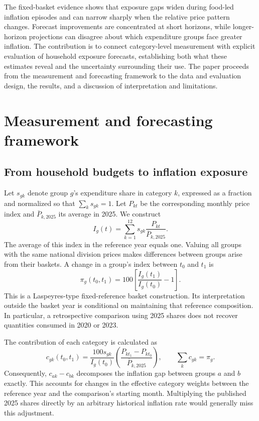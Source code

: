 \documentclass[11pt,a4paper]{article}
\begin{document}
The fixed-basket evidence shows that exposure gaps widen during food-led inflation episodes and can narrow sharply when the relative price pattern changes. Forecast improvements are concentrated at short horizons, while longer-horizon projections can disagree about which expenditure groups face greater inflation. The contribution is to connect category-level measurement with explicit evaluation of household exposure forecasts, establishing both what these estimates reveal and the uncertainty surrounding their use. The paper proceeds from the measurement and forecasting framework to the data and evaluation design, the results, and a discussion of interpretation and limitations.

\section{Measurement and forecasting framework}

\subsection{From household budgets to inflation exposure}

Let $s_{gk}$ denote group $g$'s expenditure share in category $k$, expressed as a fraction and normalized so that $\sum_k s_{gk}=1$. Let $P_{kt}$ be the corresponding monthly price index and $\bar P_{k,2025}$ its average in 2025. We construct
\begin{equation}
 I_g(t)=\sum_{k=1}^{12}s_{gk}\frac{P_{kt}}{\bar P_{k,2025}}.
 \label{eq:index}
\end{equation}
The average of this index in the reference year equals one. Valuing all groups with the same national division prices makes differences between groups arise from their baskets. A change in a group's index between $t_0$ and $t_1$ is
\begin{equation}
 \pi_g(t_0,t_1)=100\left[\frac{I_g(t_1)}{I_g(t_0)}-1\right].
 \label{eq:inflation}
\end{equation}
This is a Laspeyres-type fixed-reference basket construction. Its interpretation outside the basket year is conditional on maintaining that reference composition. In particular, a retrospective comparison using 2025 shares does not recover quantities consumed in 2020 or 2023.

The contribution of each category is calculated as
\begin{equation}
 c_{gk}(t_0,t_1)=
 \frac{100s_{gk}}{I_g(t_0)}
 \left(\frac{P_{kt_1}-P_{kt_0}}{\bar P_{k,2025}}\right),
 \qquad \sum_k c_{gk}=\pi_g.
 \label{eq:contribution}
\end{equation}
Consequently, $c_{ak}-c_{bk}$ decomposes the inflation gap between groups $a$ and $b$ exactly. This accounts for changes in the effective category weights between the reference year and the comparison's starting month. Multiplying the published 2025 shares directly by an arbitrary historical inflation rate would generally miss this adjustment.
\end{document}
